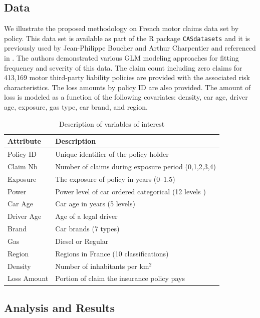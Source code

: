 \documentclass[11pt,letterpaper]{article}
\numberwithin{equation}{section}
\numberwithin{equation}{section}
\numberwithin{equation}{section}
\begin{document}
\subsection{Data}
We illustrate the proposed methodology on French motor claims data set by policy. This data set is available as part of the R package {\tt CASdatasets} and it is previously used by Jean-Philippe Boucher and Arthur Charpentier %
and referenced in \cite{Charpentier:2014}. The authors %
demonstrated various GLM modeling approaches for fitting frequency and severity of this data. The claim count including zero claims for 413,169 motor third-party liability policies are provided with the associated risk characteristics. The loss amounts by policy ID are also provided. The amount of loss is modeled as a function of the following covariates: density, car age, driver age, exposure, gas type, car brand, and region.
\begin{small}
\begin{table}[!htb]
\begin{center}
    \caption{Description of variables of interest}%
      \centering
        \begin{tabular}{ll}
\hline
Attribute & Description \\
\hline
Policy ID & Unique identifier of the policy holder\\
Claim Nb & Number of claims during exposure period  (0,1,2,3,4)\\
Exposure & The exposure of policy in years (0--1.5) \\
Power & Power level of car ordered categorical (12 levels )\\
Car Age & Car age in years (5 levels) \\
Driver Age & Age of a legal driver \\
Brand & Car brands (7 types) \\
Gas & Diesel or Regular \\
Region & Regions in France (10 classifications)\\
Density & Number of inhabitants per km$^2$ \\
Loss Amount & Portion of claim the insurance policy pays\\
\hline
		\end{tabular}
\end{center}
\end{table}
\end{small}

\subsection{Analysis and Results}
\end{document}
